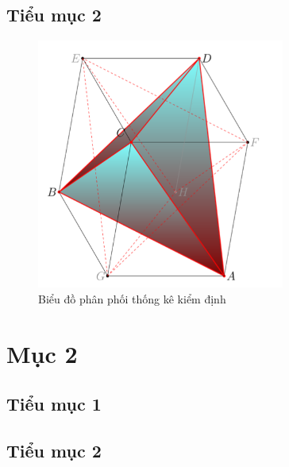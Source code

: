 \begin{tc}
    
\end{tc}

\begin{md}
    
\end{md}

\begin{cy}
    
\end{cy}

\begin{vd}
    
\end{vd}

\begin{nx}
    
\end{nx}

\begin{bd}
    
\end{bd}
\subsection{Tiểu mục 2}
\begin{figure}[h!]
    \centering
    \includegraphics[width=0.6\linewidth]{../../assets/images/figure-1.png}
    \caption{Biểu đồ phân phối thống kê kiểm định}
    \label{fig:test_distribution}
\end{figure}
\section{Mục 2}
\subsection{Tiểu mục 1}

\subsection{Tiểu mục 2}